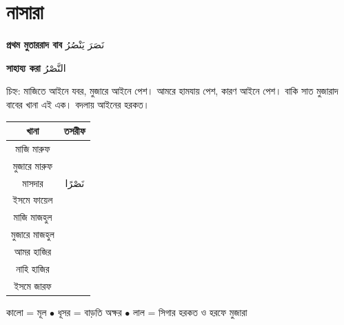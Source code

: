\newpage

\section{নাসারা}

\begin{center}
  \textbf{প্রথম মুতাররাদ বাব}
  \enspace
  {\arabicfont \textarabic{نَصَرَ يَنْصُرُ}}
\end{center}

\vspace{0.2cm}

\begin{center}
  \textbf{সাহায্য করা}
  \enspace
  {\arabicfont \textarabic{النَّصْرُ}}
\end{center}

\vspace{0.25cm}

\noindent চিহ্ন: মাজিতে আইনে যবর, মুজারে আইনে পেশ।
আমরে হামযায় পেশ, কারণ আইনে পেশ।
বাকি সাত মুজারাদ বাবের খানা এই এক। বদলায় আইনের হরকত।

\vspace{0.3cm}

\begingroup
\setlength{\arrayrulewidth}{0.5pt}
\setlength{\tabcolsep}{4pt}
\renewcommand{\arraystretch}{1.85}

\noindent\begin{tabularx}{\textwidth}{|C|C|}
  \hline
  {\color{white}\textbf{খানা}} &
  {\color{white}\textbf{তসরীফ}} \\
  \hline
  মাজি মারুফ &
  {\arabicfont {}} \\
  \hline
  মুজারে মারুফ &
  {\arabicfont {}} \\
  \hline
  মাসদার &
  {\arabicfont \textarabic{نَصْرًا}} \\
  \hline
  ইসমে ফায়েল &
  {\arabicfont {}} \\
  \hline
  মাজি মাজহুল &
  {\arabicfont {}} \\
  \hline
  মুজারে মাজহুল &
  {\arabicfont {}} \\
  \hline
  আমর হাজির &
  {\arabicfont {}} \\
  \hline
  নাহি হাজির &
  {\arabicfont {}} \\
  \hline
  ইসমে জারফ &
  {\arabicfont {}} \\
  \hline
\end{tabularx}
\endgroup

\vspace{0.25cm}

\begin{center}
  {\small
    কালো = মূল
    \enspace$\bullet$\enspace
    ধূসর = বাড়তি অক্ষর
    \enspace$\bullet$\enspace
    লাল = সিগার হরকত ও হরফে মুজারা
  }
\end{center}
